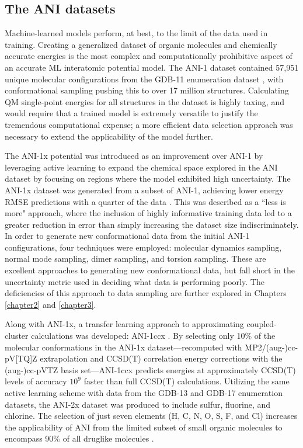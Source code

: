 \subsection{The ANI datasets}
\label{subsec:ANI_datasets}

Machine-learned models perform, at best, to the limit of the data used in training.
Creating a generalized dataset of organic molecules and chemically accurate energies is the most complex and computationally prohibitive aspect of an accurate ML interatomic potential model.
The ANI-1 dataset \cite{ani-1_dataset} contained 57,951 unique molecular configurations from the GDB-11 enumeration dataset \cite{gdb-11-1, gdb-11-2}, with conformational sampling pushing this to over 17 million structures.
Calculating QM single-point energies for all structures in the dataset is highly taxing, and would require that a trained model is extremely versatile to justify the tremendous computational expense; a more efficient data selection approach was necessary to extend the applicability of the model further.

The ANI-1x potential \cite{ani-1x} was introduced as an improvement over ANI-1 by leveraging active learning to expand the chemical space explored in the ANI dataset by focusing on regions where the model exhibited high uncertainty. 
The ANI-1x dataset \cite{1x_1ccx_datasets} was generated from a subset of ANI-1, achieving lower energy RMSE predictions with a quarter of the data \cite{ani-1x}. 
This was described as a ``less is more" approach, where the inclusion of highly informative training data led to a greater reduction in error than simply increasing the dataset size indiscriminately.
In order to generate new conformational data from the initial ANI-1 configurations, four techniques were employed: molecular dynamics sampling, normal mode sampling, dimer sampling, and torsion sampling. 
These are excellent approaches to generating new conformational data, but fall short in the uncertainty metric used in deciding what data is performing poorly.
The deficiencies of this approach to data sampling are further explored in Chapters \ref{chapter2} and \ref{chapter3}. 

Along with ANI-1x, a transfer learning approach to approximating coupled-cluster calculations was developed: ANI-1ccx \cite{1x_1ccx_datasets}. 
By selecting only 10\% of the molecular conformations in the ANI-1x dataset---recomputed with MP2/(aug-)cc-pV[TQ]Z \cite{1ccx_ccsd(t)} extrapolation and CCSD(T) correlation energy corrections with the (aug-)cc-pVTZ \cite{1ccx_basis} basis set---ANI-1ccx predicts energies at approximately CCSD(T) levels of accuracy $10^9$ faster than full CCSD(T) calculations.
Utilizing the same active learning scheme with data from the GDB-13 \cite{gdb-13} and GDB-17 \cite{gdb-17} enumeration datasets, the ANI-2x dataset was produced to include sulfur, fluorine, and chlorine.
The selection of just seven elements (H, C, N, O, S, F, and Cl) increases the applicability of ANI from the limited subset of small organic molecules to encompass 90\% of all druglike molecules \cite{ani-2x}.

